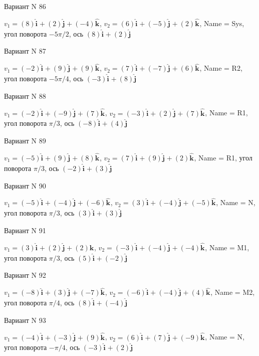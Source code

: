 \documentclass[11pt]{report}
\begin{document}
Вариант N 86

$v_1 = (8)\mathbf{\hat{i}_{}} + (2)\mathbf{\hat{j}_{}} + (-4)\mathbf{\hat{k}_{}}$, $v_2 = (6)\mathbf{\hat{i}_{}} + (-5)\mathbf{\hat{j}_{}} + (2)\mathbf{\hat{k}_{}}$, Name = Sys, угол поворота $- 5 \pi / 2$, ось $(8)\mathbf{\hat{i}_{}} + (2)\mathbf{\hat{j}_{}}$

Вариант N 87

$v_1 = (-2)\mathbf{\hat{i}_{}} + (9)\mathbf{\hat{j}_{}} + (9)\mathbf{\hat{k}_{}}$, $v_2 = (7)\mathbf{\hat{i}_{}} + (-7)\mathbf{\hat{j}_{}} + (6)\mathbf{\hat{k}_{}}$, Name = R2, угол поворота $- 5 \pi / 4$, ось $(-3)\mathbf{\hat{i}_{}} + (8)\mathbf{\hat{j}_{}}$

Вариант N 88

$v_1 = (-2)\mathbf{\hat{i}_{}} + (-9)\mathbf{\hat{j}_{}} + (7)\mathbf{\hat{k}_{}}$, $v_2 = (-3)\mathbf{\hat{i}_{}} + (2)\mathbf{\hat{j}_{}} + (7)\mathbf{\hat{k}_{}}$, Name = R1, угол поворота $\pi / 3$, ось $(-8)\mathbf{\hat{i}_{}} + (4)\mathbf{\hat{j}_{}}$

Вариант N 89

$v_1 = (-5)\mathbf{\hat{i}_{}} + (9)\mathbf{\hat{j}_{}} + (8)\mathbf{\hat{k}_{}}$, $v_2 = (7)\mathbf{\hat{i}_{}} + (9)\mathbf{\hat{j}_{}} + (2)\mathbf{\hat{k}_{}}$, Name = R1, угол поворота $\pi / 3$, ось $(-2)\mathbf{\hat{i}_{}} + (3)\mathbf{\hat{j}_{}}$

Вариант N 90

$v_1 = (-5)\mathbf{\hat{i}_{}} + (-4)\mathbf{\hat{j}_{}} + (-6)\mathbf{\hat{k}_{}}$, $v_2 = (3)\mathbf{\hat{i}_{}} + (-4)\mathbf{\hat{j}_{}} + (-5)\mathbf{\hat{k}_{}}$, Name = N, угол поворота $\pi / 3$, ось $(3)\mathbf{\hat{i}_{}} + (3)\mathbf{\hat{j}_{}}$

Вариант N 91

$v_1 = (3)\mathbf{\hat{i}_{}} + (2)\mathbf{\hat{j}_{}} + (2)\mathbf{\hat{k}_{}}$, $v_2 = (-3)\mathbf{\hat{i}_{}} + (-4)\mathbf{\hat{j}_{}} + (-4)\mathbf{\hat{k}_{}}$, Name = M1, угол поворота $\pi / 3$, ось $(5)\mathbf{\hat{i}_{}} + (-2)\mathbf{\hat{j}_{}}$

Вариант N 92

$v_1 = (-8)\mathbf{\hat{i}_{}} + (3)\mathbf{\hat{j}_{}} + (-7)\mathbf{\hat{k}_{}}$, $v_2 = (-6)\mathbf{\hat{i}_{}} + (-4)\mathbf{\hat{j}_{}} + (4)\mathbf{\hat{k}_{}}$, Name = M2, угол поворота $\pi / 4$, ось $(8)\mathbf{\hat{i}_{}} + (-4)\mathbf{\hat{j}_{}}$

Вариант N 93

$v_1 = (-4)\mathbf{\hat{i}_{}} + (-3)\mathbf{\hat{j}_{}} + (9)\mathbf{\hat{k}_{}}$, $v_2 = (6)\mathbf{\hat{i}_{}} + (7)\mathbf{\hat{j}_{}} + (-9)\mathbf{\hat{k}_{}}$, Name = N, угол поворота $- \pi / 4$, ось $(-3)\mathbf{\hat{i}_{}} + (2)\mathbf{\hat{j}_{}}$
\end{document}
